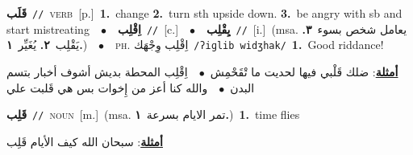\documentclass[10pt,a4paper,twoside]{article} %
\begin{document}
\begin{multicols}{2}
{\setlength\topsep{0pt}\textbf{\foreignlanguage{arabic}{قَلَب}}\ {\color{gray}\texttt{//}\color{black}}\ \textsc{verb}\ [p.]\ \textbf{1.}~change  \textbf{2.}~turn sth upside down.  \textbf{3.}~be angry with sb and start mistreating\ \ $\bullet$\ \ \setlength\topsep{0pt}\textbf{\foreignlanguage{arabic}{اِقْلِب}}\ {\color{gray}\texttt{//}\color{black}}\ [c.]\ \ $\bullet$\ \ \setlength\topsep{0pt}\textbf{\foreignlanguage{arabic}{يِقْلِب}}\ {\color{gray}\texttt{//}\color{black}}\ [i.]\ \color{gray}(msa. \foreignlanguage{arabic}{يعامل شخص بسوء}~\foreignlanguage{arabic}{\textbf{٣.}}  \foreignlanguage{arabic}{يَقْلِب}~\foreignlanguage{arabic}{\textbf{٢.}}  \foreignlanguage{arabic}{يُغَيِّر}~\foreignlanguage{arabic}{\textbf{١.}})\color{black}\ \ $\bullet$\ \ \textsc{ph.} \color{gray} \foreignlanguage{arabic}{اِقْلِب وِجْهَك}\color{black}\ {\color{gray}\texttt{/{\sffamily ʔiɡlib widʒhak}/}\color{black}}\ \textbf{1.}~Good riddance!\  \begin{flushright}\color{gray}\foreignlanguage{arabic}{\textbf{\underline{\foreignlanguage{arabic}{أمثلة}}}: ضلك قَلْبي فيها لحديت ما تْقَحْمِش\ $\bullet$\ \  اِقْلِب المحطة بديش أشوف أخبار بتسم البدن\ $\bullet$\ \  والله كنا أعز من إِخوات بس هي قَلبت علي}\end{flushright}\color{black}} \vspace{2mm}

{\setlength\topsep{0pt}\textbf{\foreignlanguage{arabic}{قَلِب}}\ {\color{gray}\texttt{//}\color{black}}\ \textsc{noun}\ [m.]\ \color{gray}(msa. \foreignlanguage{arabic}{تمر الايام بسرعة}~\foreignlanguage{arabic}{\textbf{١.}})\color{black}\ \textbf{1.}~time flies\  \begin{flushright}\color{gray}\foreignlanguage{arabic}{\textbf{\underline{\foreignlanguage{arabic}{أمثلة}}}: سبحان الله كيف الأيام قَلِب}\end{flushright}\color{black}} \vspace{2mm}


\end{multicols}
\end{document}
